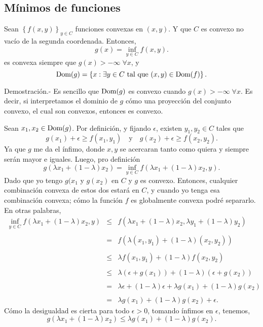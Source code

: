 \begin{paracol}{2}
\section{Mínimos de funciones}
\begin{teo} Sean $\left\{f(x,y)\right\}_{y\in C}$ funciones convexas en $(x,y)$. Y que $C$ es convexo no vacío de la segunda coordenada. Entonces,
    $$g(x)=\inf_{y\in C}f(x,y).$$
    es convexa siempre que $g(x)>-\infty \; \forall x$, y 
    $$\mathop{\mbox{\normalfont Dom}}\nolimits(g)=\left\{x: \exists y\in C \text{ tal que } (x,y)\in \mathop{\mbox{\normalfont Dom}}\nolimits(f)\right\}.$$

	Demostración.-\; Es sencillo que $\mathop{\mbox{\normalfont Dom}}\nolimits(g)$ es convexo cuando $g(x)>-\infty \; \forall x$. Es decir, si interpretamos el dominio de $g$ cómo una proyección del conjunto convexo, el cual son convexos, entonces es convexo.

	Sean $x_1,x_2\in \mathop{\mbox{\normalfont Dom}}\nolimits(g)$. Por definición, y fijando $\epsilon$, existen $y_1,y_2\in C$ tales que 
	$$g(x_1)+\epsilon \geq f(x_1,y_1) \quad \text{y} \quad g(x_2)+\epsilon \geq f(x_2,y_2).$$
	Ya que $g$ me da el ínfimo, donde $x,y$ se acercaran tanto como quiera y siempre serán mayor e iguales. Luego, pro definición
	$$g(\lambda x_1+(1-\lambda)x_2) = \inf_{y\in C}f(\lambda x_1+(1-\lambda)x_2,y).$$
	Dado que yo tengo $g(x_1$ y $g(x_2)$ en $C$ y $g$ es convexo. Entonces, cualquier combinación convexa de estos dos estará en $C$, y cuando yo tenga esa combinación convexa; cómo la función $f$ es globalmente convexa podré separarlo. En otras palabras,
	$$
	\begin{array}{rcl}
	    \displaystyle\inf_{y\in C}f(\lambda x_1+(1-\lambda)x_2,y)&\leq& f(\lambda x_1+(1-\lambda)x_2,\lambda y_1+(1-\lambda)y_2)\\\\
							&=& f(\lambda (x_1,y_1)+(1-\lambda)(x_2,y_2))\\\\
							&\leq& \lambda f(x_1,y_1)+(1-\lambda)f(x_2,y_2)\\\\
							&\leq&\lambda\left(\epsilon+g(x_1)\right)+(1-\lambda)\left(\epsilon+g(x_2)\right)\\\\
							&=&\lambda \epsilon+(1-\lambda)\epsilon+\lambda g(x_1)+(1-\lambda)g(x_2)\\\\
							&=&\lambda g(x_1)+(1-\lambda)g(x_2)+\epsilon.
	\end{array}
	$$
	Cómo la desigualdad es cierta para todo $\epsilon>0$, tomando ínfimos en $\epsilon$, tenemos,
	$$g(\lambda x_1+(1-\lambda)x_2)\leq \lambda g(x_1)+(1-\lambda)g(x_2).$$
\end{teo}




\end{paracol}
